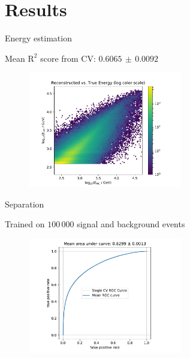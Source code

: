\section{Results}
\begin{frame}[t]{Energy estimation}

Mean $\text{R}^2$ score from CV: $0.6065\,\pm\,0.0092$

\begin{figure}
    \centering
    \includegraphics[width=0.6\textwidth,page=1]{fig/energy-performance.pdf}
\end{figure}
\end{frame}

\begin{frame}[t]{Separation}

Trained on $100\,000$ signal and background events
\begin{figure}
    \centering
    \includegraphics[width=0.6\textwidth,page=1]{fig/separation_performance.pdf}
\end{figure}
\end{frame}

